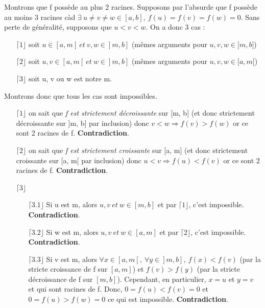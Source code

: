 \documentclass[a4paper, 12pt]{article}
\begin{document}
Montrons que f possède au plus 2 racines. \newline \newline
Supposons par l'absurde que f possède au moins 3 racines càd \newline
\( \exists ~ u \neq v \neq w \in [a, b], ~ f(u) = f(v) = f(w) = 0 \). \newline
Sans perte de généralité, supposons que \( u < v < w \). \newline
On a donc 3 cas :
\begin{enumerate}
	\item[\(\lceil 1 \rfloor\)] soit \( u \in [a, m[ ~ et ~ v, w \in ]m, b] \) (mêmes arguments pour \( u, v, w \in ]m, b] \))
	\item[\(\lceil 2 \rfloor\)] soit \( u, v \in [a, m[ ~ et ~ w \in ]m, b] \) (mêmes arguments pour \( u, v, w \in [a, m[ \))
	\item[\(\lceil 3 \rfloor\)] soit u, v ou w est notre m.
\end{enumerate}
Montrons donc que tous les cas sont impossibles.
\begin{enumerate}
	\item[\(\lceil 1 \rfloor\)] on sait que \emph{f est strictement décroissante} sur [m, b] (et donc strictement décroissante sur ]m, b] par inclusion) donc \( v < w \Rightarrow f(v) > f(w) \) or ce sont 2 racines de f. \textbf{Contradiction}.
	\item[\(\lceil 2 \rfloor\)] on sait que \emph{f est strictement croissante} sur [a, m] (et donc strictement croissante sur [a, m[ par inclusion) donc \( u < v \Rightarrow f(u) < f(v) \) or ce sont 2 racines de f. \textbf{Contradiction}.
	\item[\(\lceil 3 \rfloor\)] $~$ \newline
	\begin{enumerate}
		\item[\(\lceil 3.1 \rfloor\)] Si u est m, alors \( u, v ~ et ~ w \in [m, b] \) et par \(\lceil 1 \rfloor\), c'est impossible. \textbf{Contradiction}.
		\item[\(\lceil 3.2 \rfloor\)] Si w est m, alors \( u, v ~ et ~ w \in [a, m] \) et par \(\lceil 2 \rfloor\), c'est impossible. \textbf{Contradiction}.
		\item[\(\lceil 3.3 \rfloor\)] Si v est m, alors \( \forall x \in [a, m[, ~ \forall y \in ]m, b], ~ f(x) < f(v) \) (par la stricte croissance de f sur \( [a, m] \)) et \( f(v) > f(y)\) (par la stricte décroissance de f sur \( [m, b] \)). Cependant, en particulier, \( x = u \) et \( y = v \) et qui sont racines de f. Donc, \( 0 = f(u) < f(v) = 0 \) et \( 0 = f(u) > f(w) = 0 \) ce qui est impossible. \textbf{Contradiction}.
	\end{enumerate}
\end{enumerate}
\end{document}
